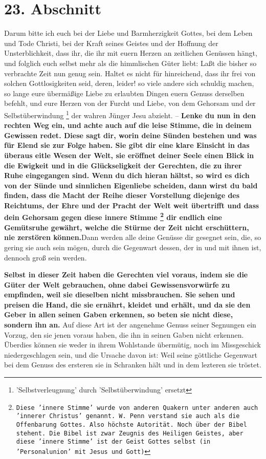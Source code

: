 \section{23. Abschnitt} \label{kap4_ab23}

Darum bitte ich euch bei der Liebe und Barmherzigkeit Gottes, bei dem Leben und
Tode Christi, bei der Kraft seines Geistes und der Hoffnung der Unsterblichkeit,
dass ihr, die ihr mit euern Herzen an zeitlichen Genüssen hängt, und folglich
euch selbst mehr als die himmlischen Güter liebt: Laßt die bisher so
verbrachte Zeit nun genug sein. Haltet es nicht für hinreichend, dass ihr frei
von solchen Gottlosigkeiten seid, deren, leider! so viele andere sich schuldig
machen, so lange eure übermäßige Liebe zu erlaubten Dingen euern Genuss derselben
befehlt, und eure Herzen von der Furcht und Liebe, von dem Gehorsam und der
Selbstüberwindung \footnote{'Selbstverleugnung' durch 'Selbstüberwindung' ersetzt} der wahren Jünger Jesu abzieht. -- \textbf{Lenke du nun in den
rechten Weg ein, und achte auch auf die leise Stimme, die in deinem Gewissen redet.
Diese sagt dir, worin deine Sünden bestehen und was für Elend sie zur Folge
haben. Sie gibt dir eine klare Einsicht in das überaus eitle Wesen der Welt,
sie eröffnet deiner Seele einen Blick in die Ewigkeit und in die Glückseligkeit
der Gerechten, die zu ihrer Ruhe eingegangen sind. Wenn du dich hieran hältst,
so wird es dich von der Sünde und sinnlichen Eigenliebe scheiden, dann wirst du
bald finden, dass die Macht der Reihe dieser Vorstellung diejenige des
Reichtums, der Ehre und der Pracht der Welt weit übertrifft und dass dein
Gehorsam gegen diese innere Stimme 
\footnote{\texttt{Diese 'innere Stimme' wurde von anderen Quakern unter anderen
auch 'innerer Christus' genannt. W. Penn verstand sie auch als die Offenbarung
Gottes. Also höchste Autorität. Noch über der Bibel stehent. Die Bibel
ist zwar Zeugnis des Heiligen Geistes, aber diese 'innere Stimme' ist
der Geist Gottes selbst (in 'Personalunion' mit Jesus und Gott)}}
dir endlich eine Gemütsruhe gewährt, welche
die Stürme der Zeit nicht erschüttern, nie zerstören können.}Dann werden alle
deine Genüsse dir gesegnet sein, die, so gering sie auch sein mögen, durch die
Gegenwart dessen, der in und mit ihnen ist, dennoch groß sein werden.

\medskip

\textbf{Selbst in dieser Zeit haben die Gerechten viel voraus, indem sie die
Güter der
Welt gebrauchen, ohne dabei Gewissensvorwürfe zu empfinden, weil sie dieselben
nicht missbrauchen. Sie sehen und preisen die Hand, die sie ernährt, kleidet und
erhält, und da sie den Geber in allen seinen Gaben erkennen, so beten sie nicht
diese, sondern ihn an.} Auf diese Art ist der angenehme Genuss seiner Segnungen
ein Vorzug, den sie jenen voraus haben, die ihn in seinen Gaben nicht
erkennen. Überdies können sie weder in ihrem Wohlstande übermütig, noch im
Missgeschick niedergeschlagen sein, und die Ursache davon ist: Weil seine
göttliche Gegenwart bei dem Genuss des ersteren sie in Schranken hält und in
dem lezteren sie tröstet.

